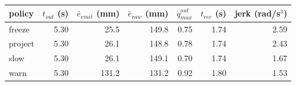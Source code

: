 \begin{tabular}{lrrrrrr}
\toprule
policy & $t_{out}$ (s) & $\bar{e}_{emit}$ (mm) & $\bar{e}_{raw}$ (mm) & $\dot{q}_{max}^{out}$ & $t_{rec}$ (s) & jerk (rad/s$^3$) \\
\midrule
freeze & 5.30 & 25.5 & 149.8 & 0.75 & 1.74 & 2.59 \\
project & 5.30 & 26.1 & 148.8 & 0.78 & 1.74 & 2.43 \\
slow & 5.30 & 26.1 & 149.1 & 0.70 & 1.74 & 1.67 \\
warn & 5.30 & 131.2 & 131.2 & 0.92 & 1.80 & 1.53 \\
\bottomrule
\end{tabular}
